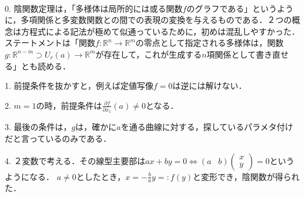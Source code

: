\documentclass[uplatex, dvipdfmx]{jsreport}
\begin{document}
\begin{remark}　

    0. 陰関数定理は，「多様体は局所的には或る関数$f$のグラフである」というように，多項関係と多変数関数との間での表現の変換を与えるものである．２つの概念は方程式による記法が極めて似通っているために，初めは混乱しやすかった．
    ステートメントは「関数$f:\mathbb{R}^n\to\mathbb{R}^m$の零点として指定される多様体は，関数$g:\mathbb{R}^{n-m}\supset U_r(a)\to\mathbb{R}^m$が存在して，これが生成する$n$項関係として書き直せる」とも読める．

    1. 前提条件を抜かすと，例えば定値写像$f=0$は逆には解けない．

    2. $m=1$の時，前提条件は$\frac{\partial f}{\partial x_1}(a)\ne 0$となる．

    3. 最後の条件は，$g$は，確かに$a$を通る曲線に対する，探しているパラメタ付けだと言っているのみである．

    4. ２変数で考える．その線型主要部は$ax+by=0\Leftrightarrow (a\; \;\; b)\left(\begin{array}{c}x\\y\end{array}\right)=0$というようになる．
    $a\ne 0$としたとき，$x=-\frac{b}{a}y=:f(y)$と変形でき，陰関数が得られた．
\end{remark}
\end{document}
